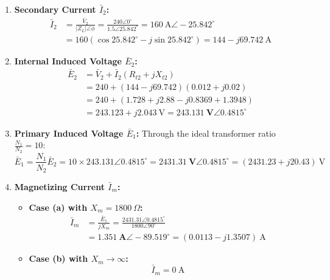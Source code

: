 \begin{enumerate}
    \item \textbf{Secondary Current $\bar{I}_2$:}
    \begin{align}
        \bar{I}_2 &= \frac{\bar{V}_2}{|Z_L|\angle \phi} = \frac{240\angle 0^\circ}{1.5\angle 25.842^\circ} = 160\ \text{A} \angle -25.842^\circ \nonumber\\
                  &= 160(\cos 25.842^\circ - j\sin 25.842^\circ) = 144 - j69.742\ \text{A}
    \end{align}

    \item \textbf{Internal Induced Voltage $\bar{E}_2$:}
    \begin{align}
        \bar{E}_2 &= \bar{V}_2 + \bar{I}_2 (R_{t2} + jX_{t2}) \nonumber\\
                  &= 240 + (144 - j69.742)(0.012 + j0.02) \nonumber\\
                  &= 240 + (1.728 + j2.88 - j0.8369 + 1.3948) \nonumber\\
                  &= 243.123 + j2.043\ \text{V} = \mathbf{243.131\ \text{V} \angle 0.4815^\circ}
    \end{align}

    \item \textbf{Primary Induced Voltage $\bar{E}_1$:}
    Through the ideal transformer ratio $\frac{N_1}{N_2} = 10$:
    \begin{equation}
        \bar{E}_1 = \frac{N_1}{N_2} \bar{E}_2 = 10 \times 243.131\angle 0.4815^\circ = \mathbf{2431.31\ \text{V} \angle 0.4815^\circ} = (2431.23 + j20.43)\ \text{V}
    \end{equation}

    \item \textbf{Magnetizing Current $\bar{I}_m$:}
    \begin{itemize}
        \item \textbf{Case (a) with $X_m = 1800\ \Omega$:}
        \begin{align}
            \bar{I}_m &= \frac{\bar{E}_1}{jX_m} = \frac{2431.31\angle 0.4815^\circ}{1800\angle 90^\circ} \nonumber\\
                      &= \mathbf{1.351\ \text{A} \angle -89.519^\circ} = (0.0113 - j1.3507)\ \text{A}
        \end{align}
        \item \textbf{Case (b) with $X_m \to \infty$:}
        \begin{equation}
            \bar{I}_m = 0\ \text{A}
        \end{equation}
    \end{itemize}


\end{enumerate}
